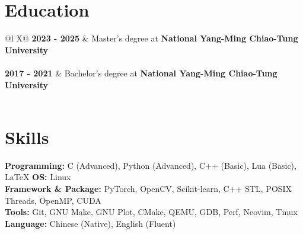 \documentclass[a4paper,12pt]{article}
\begin{document}
\section{Education}
\begin{tabularx}{\linewidth}{@{}l X@{}}	
\textbf{2023 - 2025} & Master's degree at \textbf{National Yang-Ming Chiao-Tung University} \\%
  \\[3.75pt]

\textbf{2017 - 2021} & Bachelor's degree at \textbf{National Yang-Ming Chiao-Tung University} \\%
  \\ 
\end{tabularx}


\section{Skills}

\fontsize{10pt}{14pt}\selectfont
\noindent \textbf{Programming:} C (Advanced), Python (Advanced), C++ (Basic), Lua (Basic), \LaTeX \hspace{0.5cm} \textbf{OS:} Linux \\ [0.08cm]
\textbf{Framework \& Package:} PyTorch, OpenCV, Scikit-learn, C++ STL, POSIX Threads, OpenMP, CUDA \\ [0.08cm]
\textbf{Tools:} Git, GNU Make, GNU Plot, CMake, QEMU, GDB, Perf, Neovim, Tmux \\ [0.08cm]
\textbf{Language:} Chinese (Native), English (Fluent)

\vfill
{}
\end{document}

